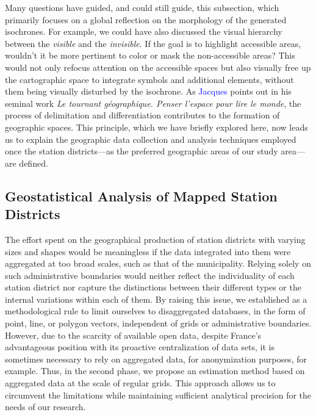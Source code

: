 \begin{refsegment}
Many questions have guided, and could still guide, this subsection, which primarily focuses on a global reflection on the morphology of the generated isochrones. For example, we could have also discussed the visual hierarchy between the \textsl{visible} and the \textsl{invisible}. If the goal is to highlight accessible areas, wouldn't it be more pertinent to color or mask the non-accessible areas? This would not only refocus attention on the accessible spaces but also visually free up the cartographic space to integrate symbols and additional elements, without them being visually disturbed by the isochrone. As \textcolor{blue}{Jacques} \textcolor{blue}{\textcite[5]{levy_tournant_1999}} points out in his seminal work \textsl{Le tournant géographique. Penser l'espace pour lire le monde}, the process of delimitation and differentiation contributes to the formation of geographic spaces. This principle, which we have briefly explored here, now leads us to explain the geographic data collection and analysis techniques employed once the station districts—as the preferred geographic areas of our study area—are defined.%

\subsection{Geostatistical Analysis of Mapped Station Districts
    \label{chap3:quartiers-gare-analyse-geostatistique}
    }

The effort spent on the geographical production of station districts with varying sizes and shapes would be meaningless if the data integrated into them were aggregated at too broad scales, such as that of the municipality. Relying solely on such administrative boundaries would neither reflect the individuality of each station district nor capture the distinctions between their different types or the internal variations within each of them. By raising this issue, we established as a methodological rule to limit ourselves to disaggregated databases, in the form of point, line, or polygon vectors, independent of grids or administrative boundaries. However, due to the scarcity of available open data, despite France's advantageous position with its proactive centralization of data sets, it is sometimes necessary to rely on aggregated data, for anonymization purposes, for example. Thus, in the second phase, we propose an estimation method based on aggregated data at the scale of regular grids. This approach allows us to circumvent the limitations while maintaining sufficient analytical precision for the needs of our research.%


\end{refsegment}
